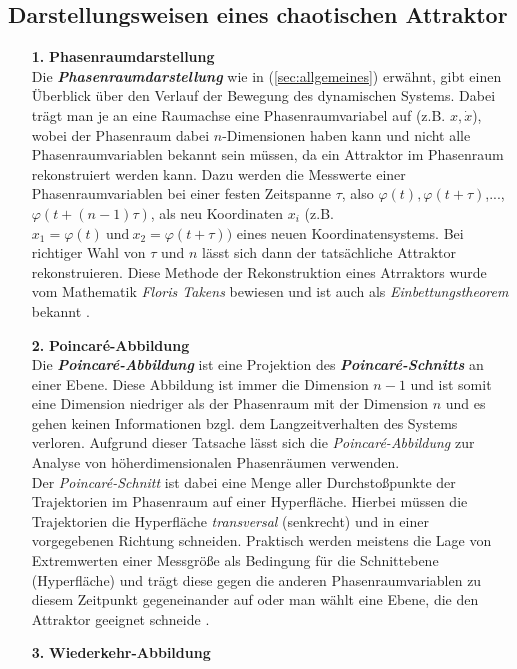 \subsection{Darstellungsweisen eines chaotischen Attraktor}
\label{sub:darstellungAttraktor}
\begin{itemize}
    \item[\textbf{1.}]{\textbf{Phasenraumdarstellung}}\\
    Die \textit{\textbf{Phasenraumdarstellung}} wie in (\ref{sec:allgemeines}) erwähnt, gibt einen Überblick über den Verlauf der Bewegung des dynamischen Systems. Dabei trägt man je an eine Raumachse eine Phasenraumvariabel auf (z.B. $x, \dot{x}$), wobei der Phasenraum dabei $n$-Dimensionen haben kann und nicht alle Phasenraumvariablen bekannt sein müssen, da ein Attraktor im Phasenraum rekonstruiert werden kann. Dazu werden die Messwerte einer Phasenraumvariablen bei einer festen Zeitspanne $\tau$, also $\varphi(t), \varphi(t+\tau)$,..., $\varphi(t+(n-1)\tau)$, als neu Koordinaten $x_i$ (z.B. $x_1=\varphi(t)~\text{und}~x_2=\varphi(t+\tau))$ eines neuen Koordinatensystems. Bei richtiger Wahl von $\tau$ und $n$ lässt sich dann der tatsächliche Attraktor rekonstruieren. Diese Methode der Rekonstruktion eines Atrraktors wurde vom Mathematik \textit{Floris Takens} bewiesen und ist auch als \textit{Einbettungstheorem} bekannt \citep{Lueck}.
    \item[\textbf{2.}]{\textbf{Poincar\'e-Abbildung}}\\
    Die \textit{\textbf{Poincar\'e-Abbildung}} ist eine Projektion des \textit{\textbf{Poincar\'e-Schnitts}} an einer Ebene. Diese Abbildung ist immer die Dimension $n-1$ und ist somit eine Dimension niedriger als der Phasenraum mit der Dimension $n$ und es gehen keinen Informationen bzgl. dem Langzeitverhalten des Systems verloren. Aufgrund dieser Tatsache lässt sich die \textit{Poincar\'e-Abbildung} zur Analyse von höherdimensionalen Phasenräumen verwenden.\\
    Der \textit{Poincar\'e-Schnitt} ist dabei eine Menge aller Durchstoßpunkte der Trajektorien im Phasenraum auf einer Hyperfläche. Hierbei müssen die Trajektorien die Hyperfläche \textit{transversal} (senkrecht) und in einer vorgegebenen Richtung schneiden. Praktisch werden meistens die Lage von Extremwerten einer Messgröße als Bedingung für die Schnittebene (Hyperfläche) und trägt diese gegen die anderen Phasenraumvariablen zu diesem Zeitpunkt gegeneinander auf oder man wählt eine Ebene, die den Attraktor geeignet schneide \citep{Lueck}.
    \item[\textbf{3.}]{\textbf{Wiederkehr-Abbildung}}\\

\end{itemize}
